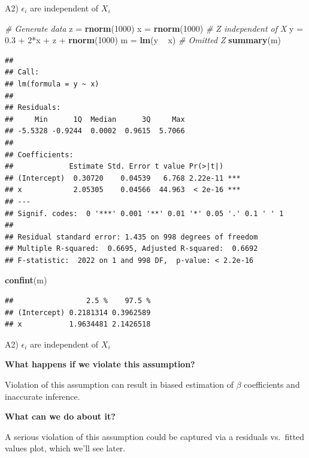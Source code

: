 \documentclass[12pt,ignorenonframetext,]{beamer}
\newenvironment{Shaded}{\begin{snugshade}}{\end{snugshade}}
\newcommand{\KeywordTok}[1]{\textcolor[rgb]{0.13,0.29,0.53}{\textbf{{#1}}}}
\newcommand{\DecValTok}[1]{\textcolor[rgb]{0.00,0.00,0.81}{{#1}}}
\newcommand{\FloatTok}[1]{\textcolor[rgb]{0.00,0.00,0.81}{{#1}}}
\newcommand{\StringTok}[1]{\textcolor[rgb]{0.31,0.60,0.02}{{#1}}}
\newcommand{\CommentTok}[1]{\textcolor[rgb]{0.56,0.35,0.01}{\textit{{#1}}}}
\newcommand{\NormalTok}[1]{{#1}}
\begin{document}
\begin{frame}[fragile]{A2) \(\epsilon_i\) are independent of \(X_i\)}

\tiny

\begin{Shaded}
\begin{Highlighting}[]
\CommentTok{# Generate data}
\NormalTok{z =}\StringTok{ }\KeywordTok{rnorm}\NormalTok{(}\DecValTok{1000}\NormalTok{)}
\NormalTok{x =}\StringTok{ }\KeywordTok{rnorm}\NormalTok{(}\DecValTok{1000}\NormalTok{) }\CommentTok{# Z independent of X}
\NormalTok{y =}\StringTok{ }\FloatTok{0.3} \NormalTok{+}\StringTok{ }\DecValTok{2}\NormalTok{*x +}\StringTok{ }\NormalTok{z +}\StringTok{ }\KeywordTok{rnorm}\NormalTok{(}\DecValTok{1000}\NormalTok{)}
\NormalTok{m =}\StringTok{ }\KeywordTok{lm}\NormalTok{(y ~}\StringTok{ }\NormalTok{x) }\CommentTok{# Omitted Z}
\KeywordTok{summary}\NormalTok{(m)}
\end{Highlighting}
\end{Shaded}

\begin{verbatim}
## 
## Call:
## lm(formula = y ~ x)
## 
## Residuals:
##     Min      1Q  Median      3Q     Max 
## -5.5328 -0.9244  0.0002  0.9615  5.7066 
## 
## Coefficients:
##             Estimate Std. Error t value Pr(>|t|)    
## (Intercept)  0.30720    0.04539   6.768 2.22e-11 ***
## x            2.05305    0.04566  44.963  < 2e-16 ***
## ---
## Signif. codes:  0 '***' 0.001 '**' 0.01 '*' 0.05 '.' 0.1 ' ' 1
## 
## Residual standard error: 1.435 on 998 degrees of freedom
## Multiple R-squared:  0.6695, Adjusted R-squared:  0.6692 
## F-statistic:  2022 on 1 and 998 DF,  p-value: < 2.2e-16
\end{verbatim}

\begin{Shaded}
\begin{Highlighting}[]
\KeywordTok{confint}\NormalTok{(m)}
\end{Highlighting}
\end{Shaded}

\begin{verbatim}
##                 2.5 %    97.5 %
## (Intercept) 0.2181314 0.3962589
## x           1.9634481 2.1426518
\end{verbatim}

\normalsize

\end{frame}

\begin{frame}{A2) \(\epsilon_i\) are independent of \(X_i\)}

\textbf{What happens if we violate this assumption?}

Violation of this assumption can result in biased estimation of
\(\beta\) coefficients and inaccurate inference.

\textbf{What can we do about it?}

A serious violation of this assumption could be captured via a residuals
vs.~fitted values plot, which we'll see later.

\end{frame}
\end{document}
